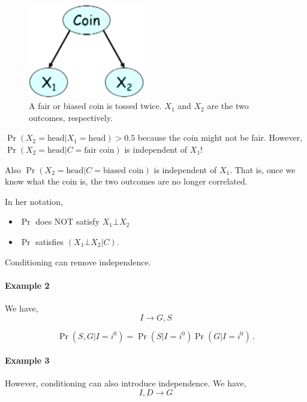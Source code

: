 \documentclass[12pt]{article}
\begin{document}
\begin{figure}[H]
\centering
\includegraphics[width=2in]{graphics/example_coin.png}
\caption{A fair or biased coin is tossed twice. $X_1$ and $X_2$ are the two outcomes, respectively.}
\label{fig:example_coin}
\end{figure}


$\Pr(X_2 = \text{head} | X_1 = \text{head}) > 0.5$ because the coin might not be fair.
However, $\Pr(X_2 = \text{head}| C = \text{fair coin})$ is independent of $X_1$!

Also $\Pr(X_2 = \text{head}| C = \text{biased coin})$ is independent of $X_1$. That is, once we know what the coin is, the two outcomes are no longer correlated.

In her notation,
\begin{itemize}
  \item $\Pr$ does NOT satisfy $X_1 \bot X_2$
  \item $\Pr$ satisfies $(X_1 \bot X_2 | C)$.
\end{itemize}
Conditioning can remove independence.


\paragraph{Example 2} 
We have,
\begin{equation*}
I \rightarrow G, S
\end{equation*}

\begin{equation*}
  \Pr(S, G | I=i^0) = \Pr(S | I=i^0) \Pr(G | I=i^0) \, .
\end{equation*}



\paragraph{Example 3} However, conditioning can also introduce independence.
We have,
\begin{equation*}
I, D \rightarrow G
\end{equation*}
\end{document}

